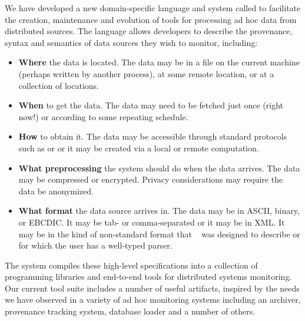 We have developed a new domain-specific language and system called
\padsd{} to facilitate the creation, maintenance and evolution of tools
for processing ad hoc data from distributed sources.  The language
allows developers to describe the provenance, syntax and
semantics of data sources they wish to monitor, including:

\begin{itemize}
\item {\bf Where} the data is located.  The data may be in a file
on the current machine (perhaps written by another process), at some 
remote location, or at a collection of locations.
\item {\bf When} to get the data.  The data may need to be fetched just 
once (right now!) or according to some repeating schedule.
\item {\bf How} to obtain it.  The data may be accessible through standard 
protocols such as  or  or it may be created via a
local or remote computation. 
\item {\bf What preprocessing} the system should do when the data arrives.  
The data may be compressed or encrypted.  Privacy considerations may require 
the data be anonymized.
\item {\bf What format} the data source arrives in.  The data may be
  in ASCII, binary, or EBCDIC. It may be tab- or comma-separated or it
  may be in XML.  It may be in the kind of non-standard format that
  \pads{}~\cite{fisher+:pads,mandelbaum+:pads-ml} was designed to 
  describe or for which the user has a well-typed parser.
\end{itemize}

The \padsd{} system compiles these high-level specifications into
a collection of programming libraries and end-to-end tools for
distributed systems monitoring.  Our current tool suite includes a
number of useful artifacts, inspired by the needs we have observed in
a variety of ad hoc monitoring systems including an archiver, provenance
tracking system, database loader and a number of others.


